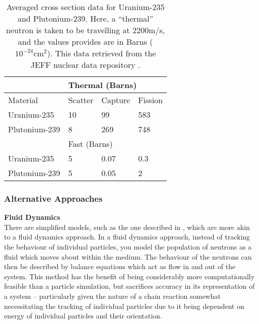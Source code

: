 \begin{table}[h!]
    \centering
    \begin{tabular}{l|lll|}
    \cline{2-4}
                                        & \multicolumn{3}{l|}{Thermal (Barns)} \\ \hline
    \multicolumn{1}{|l|}{Material} & \multicolumn{1}{l|}{Scatter} & \multicolumn{1}{l|}{Capture} & Fission \\ \hline
    \multicolumn{1}{|l|}{Uranium-235}   & 10        & 99          & 583        \\ \cline{1-1}
    \multicolumn{1}{|l|}{Plutonium-239} & 8         & 269         & 748        \\ \hline
    \multicolumn{1}{|l|}{}              & \multicolumn{3}{l|}{Fast (Barns)}    \\ \hline
    \multicolumn{1}{|l|}{Uranium-235}   & 5         & 0.07        & 0.3        \\ \cline{1-1}
    \multicolumn{1}{|l|}{Plutonium-239} & 5         & 0.05        & 2          \\ \hline
    \end{tabular}
    \caption{Averaged cross section data for Uranium-235 and Plutonium-239. Here, a ``thermal'' neutron is taken to be travelling at $2200$m/s, 
    and the values provides are in Barns ($10^{-24} \text{cm}^2$). This data retrieved from the JEFF nuclear data repository \cite{collision-kernel-data}.}
    \label{cross-sections}
\end{table}\newpage


\subsubsection{Alternative Approaches}

\noindent \textbf{Fluid Dynamics} \\
There are simplified models, such as the one described in \cite{los-alamos-primer}, which are more akin to a fluid dynamics approach. 
In a fluid dynamics approach, instead of tracking the behaviour of individual particles, you model the population of neutrons as a fluid 
which moves about within the medium. The behaviour of the neutrons can then be described by balance equations which act as flow in and out 
of the system. This method has the benefit of being considerably more computationally feasible than a particle simulation, but sacrifices accuracy 
in its representation of a system -- particularly given the nature of a chain reaction somewhat necessitating the tracking of individual particles due 
to it being dependent on energy of individual particles and their orientation.

